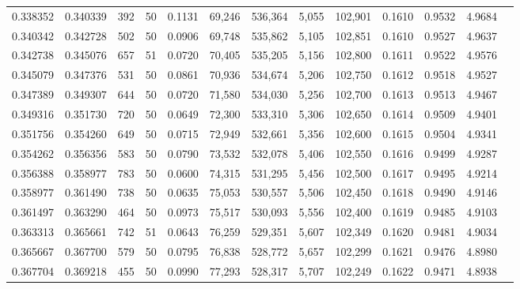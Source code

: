 \begin{tabular}{rrrrrrrrrrrrr}
0.338352 & 0.340339 &   392 &  50 &                                     0.1131 &  69,246 & 536,364 &   5,055 & 102,901 & 0.1610 & 0.9532 & 4.9684 \\
0.340342 & 0.342728 &   502 &  50 &                                     0.0906 &  69,748 & 535,862 &   5,105 & 102,851 & 0.1610 & 0.9527 & 4.9637 \\
0.342738 & 0.345076 &   657 &  51 &                                     0.0720 &  70,405 & 535,205 &   5,156 & 102,800 & 0.1611 & 0.9522 & 4.9576 \\
0.345079 & 0.347376 &   531 &  50 &                                     0.0861 &  70,936 & 534,674 &   5,206 & 102,750 & 0.1612 & 0.9518 & 4.9527 \\
0.347389 & 0.349307 &   644 &  50 &                                     0.0720 &  71,580 & 534,030 &   5,256 & 102,700 & 0.1613 & 0.9513 & 4.9467 \\
0.349316 & 0.351730 &   720 &  50 &                                     0.0649 &  72,300 & 533,310 &   5,306 & 102,650 & 0.1614 & 0.9509 & 4.9401 \\
0.351756 & 0.354260 &   649 &  50 &                                     0.0715 &  72,949 & 532,661 &   5,356 & 102,600 & 0.1615 & 0.9504 & 4.9341 \\
0.354262 & 0.356356 &   583 &  50 &                                     0.0790 &  73,532 & 532,078 &   5,406 & 102,550 & 0.1616 & 0.9499 & 4.9287 \\
0.356388 & 0.358977 &   783 &  50 &                                     0.0600 &  74,315 & 531,295 &   5,456 & 102,500 & 0.1617 & 0.9495 & 4.9214 \\
0.358977 & 0.361490 &   738 &  50 &                                     0.0635 &  75,053 & 530,557 &   5,506 & 102,450 & 0.1618 & 0.9490 & 4.9146 \\
0.361497 & 0.363290 &   464 &  50 &                                     0.0973 &  75,517 & 530,093 &   5,556 & 102,400 & 0.1619 & 0.9485 & 4.9103 \\
0.363313 & 0.365661 &   742 &  51 &                                     0.0643 &  76,259 & 529,351 &   5,607 & 102,349 & 0.1620 & 0.9481 & 4.9034 \\
0.365667 & 0.367700 &   579 &  50 &                                     0.0795 &  76,838 & 528,772 &   5,657 & 102,299 & 0.1621 & 0.9476 & 4.8980 \\
0.367704 & 0.369218 &   455 &  50 &                                     0.0990 &  77,293 & 528,317 &   5,707 & 102,249 & 0.1622 & 0.9471 & 4.8938 \\

\end{tabular}
